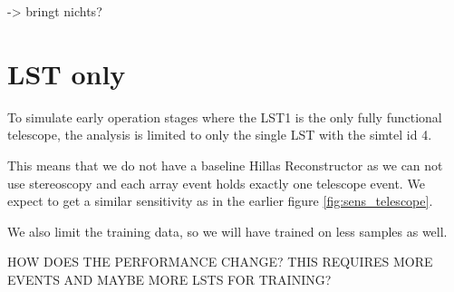-> bringt nichts?


\section{LST only}
To simulate early operation stages where the LST1 is the only fully functional 
telescope, the analysis is limited to only the single LST with 
the simtel id 4.

This means that we do not have a baseline Hillas Reconstructor as we can not use
stereoscopy and each array event holds exactly one telescope event.
We expect to
get a similar sensitivity as in the earlier figure \ref{fig:sens_telescope}.

We also limit the training data, so we will have trained on less samples as well.

HOW DOES THE PERFORMANCE CHANGE?
THIS REQUIRES MORE EVENTS AND MAYBE MORE LSTS FOR TRAINING?

